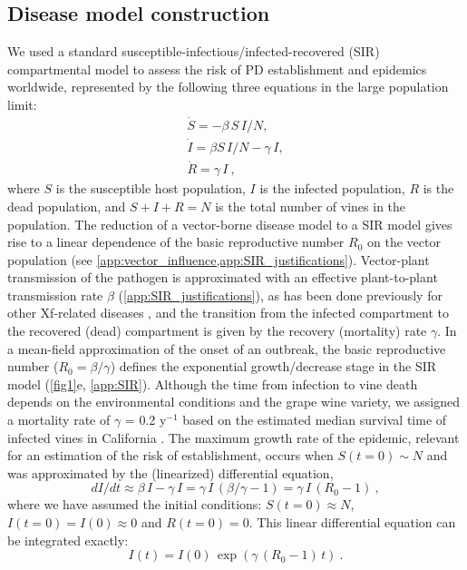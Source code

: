 \subsection{Disease model construction}

We used a standard susceptible-infectious/infected-recovered (SIR)
compartmental model to assess the risk of PD establishment and epidemics
worldwide, represented by the following three equations in the large population
limit:
\begin{equation}
    \begin{array}{l}
        \dot{S}=-\beta \, S \, I/N ,         \\
        \dot{I}=\beta S\, I/N - \gamma\,  I, \\
        \dot{R}=\gamma \, I \ ,
    \end{array}
    \label{eq:SIRmodel}
\end{equation}
where $S$ is the susceptible host population, $I$ is the infected
population, $R$ is the dead population, and $S+I+R=N$ is the total number of
vines in the population. The reduction of a vector-borne disease model to a
SIR model gives rise to a linear dependence of the basic reproductive number
$R_0$ on the vector population (see
\cref{app:vector_influence,app:SIR_justifications}).
Vector-plant transmission of the pathogen is approximated with an effective
plant-to-plant transmission rate $\beta$ (\cref{app:SIR_justifications}), as
has been done previously for other Xf-related diseases \cite{White2020}, and
the transition from the infected compartment to the recovered (dead)
compartment is given by the recovery (mortality) rate $\gamma$.  In a
mean-field approximation of the onset of an outbreak, the basic reproductive
number ($R_0=\beta/\gamma$) defines the exponential growth/decrease stage in
the SIR model (\cref{fig1}e, \cref{app:SIR}). Although the time from infection
to vine death depends on the environmental conditions and the grape wine
variety, we assigned a mortality rate of $\gamma$ = 0.2 y$^{-1}$  based on the
estimated median survival time of infected vines in California
\cite{Almeida2003}. The maximum growth rate of the epidemic, relevant for an
estimation of the risk of establishment, occurs when $S(t=0)\sim N$ and was
approximated by the (linearized) differential equation,
\begin{equation}
    dI/dt \approx \beta \, I-\gamma \, I = \gamma\,  I\, (\beta/\gamma -
    1)=\gamma \, I\, (R_0-1) \ ,
\end{equation}
where we have assumed the initial conditions:
$S(t= 0)\approx N$, $I(t = 0)= I(0) \approx0$ and $R(t = 0)=0$. This linear
differential equation can be integrated exactly:
\begin{equation}\label{eq:infect_proc}
    I(t)=I(0)\, \exp(\gamma\, (R_0-1)\, t) \ .
\end{equation}

